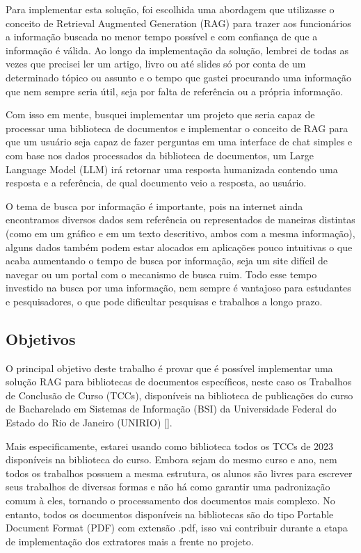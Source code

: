 \documentclass[a4paper, 12pt]{article}
\begin{document}
    Para implementar esta solução, foi escolhida uma abordagem que utilizasse o conceito de Retrieval Augmented Generation (RAG) para trazer aos funcionários a informação buscada no menor tempo possível e com confiança de que a informação é válida. Ao longo da implementação da solução, lembrei de todas as vezes que precisei ler um artigo, livro ou até slides só por conta de um determinado tópico ou assunto e o tempo que gastei procurando uma informação que nem sempre seria útil, seja por falta de referência ou a própria informação.

    Com isso em mente, busquei implementar um projeto que seria capaz de processar uma biblioteca de documentos e implementar o conceito de RAG para que um usuário seja capaz de fazer perguntas em uma interface de chat simples e com base nos dados processados da biblioteca de documentos, um Large Language Model (LLM) irá retornar uma resposta humanizada contendo uma resposta e a referência, de qual documento veio a resposta, ao usuário.

    O tema de busca por informação é importante, pois na internet ainda encontramos diversos dados sem referência ou representados de maneiras distintas (como em um gráfico e em um texto descritivo, ambos com a mesma informação), alguns dados também podem estar alocados em aplicações pouco intuitivas o que acaba aumentando o tempo de busca por informação, seja um site difícil de navegar ou um portal com o mecanismo de busca ruim. Todo esse tempo investido na busca por uma informação, nem sempre é vantajoso para estudantes e pesquisadores, o que pode dificultar pesquisas e trabalhos a longo prazo.

    \subsection{Objetivos}
    O principal objetivo deste trabalho é provar que é possível implementar uma solução RAG para bibliotecas de documentos específicos, neste caso os Trabalhos de Conclusão de Curso (TCCs), disponíveis na biblioteca de publicações do curso de Bacharelado em Sistemas de Informação (BSI) da Universidade Federal do Estado do Rio de Janeiro (UNIRIO) [\textcite{tccs_unirio}].

    Mais especificamente, estarei usando como biblioteca todos os TCCs de 2023 disponíveis na biblioteca do curso. Embora sejam do mesmo curso e ano, nem todos os trabalhos possuem a mesma estrutura, os alunos são livres para escrever seus trabalhos de diversas formas e não há como garantir uma padronização comum à eles, tornando o processamento dos documentos mais complexo. No entanto, todos os documentos disponíveis na bibliotecas são do tipo Portable Document Format (PDF) com extensão .pdf, isso vai contribuir durante a etapa de implementação dos extratores mais a frente no projeto.
    
\end{document}
